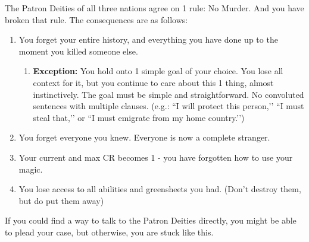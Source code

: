 \documentclass[green]{GL2020}
\begin{document}
\name{\gMurderRegular{}}

The Patron Deities of all three nations agree on 1 rule: No Murder. And you have broken that rule. The consequences are as follows:

\begin{enumerate}
  \item You forget your entire history, and everything you have done up to the moment you killed someone else.
  \begin{enumerate}
    \item \textbf{Exception:} You hold onto 1 simple goal of your choice. You lose all context for it, but you continue to care about this 1 thing, almost instinctively. The goal must be simple and straightforward. No convoluted sentences with multiple clauses. (e.g.: ``I will protect this person,’’ ``I must steal that,’’ or ``I must emigrate from my home country.’’)
  \end{enumerate}
  \item You forget everyone you knew. Everyone is now a complete stranger.
  \item Your current and max CR becomes 1 - you have forgotten how to use your magic.
  \item You lose access to all abilities and greensheets you had. (Don’t destroy them, but do put them away)
\end{enumerate}

If you could find a way to talk to the Patron Deities directly, you might be able to plead your case, but otherwise, you are stuck like this.
\end{document}
